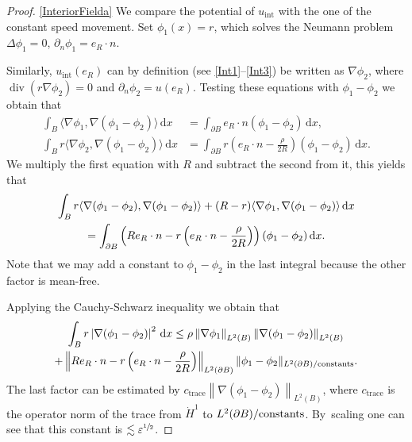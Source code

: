 \documentclass[JEP,XML,SOM,Unicode,published]{cedram}
\let\epsilon\varepsilon
\newcommand{\constants}{\textup{constants}}
\theoremstyle{definition}
\renewcommand{\div}{\operatorname{div}}
\newcommand\norm[1]{\left\lVert #1\right\rVert}
\newcommand\anorm[1]{\lVert #1\rVert}
\newcommand\scalar[2]{\langle #1,#2\rangle}
\newcommand\eq{=}
\newcommand\dd{\,\mathrm{d}}
\newcommand\dx{\dd x}
\let\de\partial
\let\eps\epsilon
\begin{document}
\skpt
\begin{proof}

\eqref{InteriorFielda}
We compare the potential of $u_\mathrm{int}$ with the one of the constant speed movement.
Set $\phi_1(x)=r$, which solves the Neumann problem $\Delta \phi_1=0$, $\de_n\phi_1=e_R\cdot n$.

Similarly, $u_\mathrm{int}(e_R)$ can by definition (see \eqref{Int1}--\eqref{Int3}) be written as $\nabla \phi_2$, where $\div(r\nabla\phi_2)=0$ and $\de_n\phi_2=u(e_R)$. Testing these equations with $\phi_1-\phi_2$ we obtain that
\begin{align*}
\int_{B} \scalar{\nabla \phi_1}{\nabla(\phi_1-\phi_2)}\dx&\eq\int_{\de B} e_R\cdot n(\phi_1-\phi_2)\dx,\\
\int_{B}r\scalar{\nabla \phi_2}{\nabla(\phi_1-\phi_2)}\dx&\eq\int_{\de B}r\left(e_R\cdot n-\frac{\rho}{2R}\right)(\phi_1-\phi_2)\dx.
\end{align*}
We multiply the first equation with $R$ and subtract the second from it, this yields that
\begin{multline*}
\int_{B} r\scalar{\nabla(\phi_1-\phi_2)}{\nabla(\phi_1-\phi_2)}+(R-r)\scalar{\nabla \phi_1}{\nabla(\phi_1-\phi_2)}\dx\\
\eq\int_{\de B} \left(Re_R\cdot n-r\left(e_R\cdot n-\frac{\rho}{2R}\right)\right)(\phi_1-\phi_2)\dx.\notag
\end{multline*}
Note that we may add a constant to $\phi_1-\phi_2$ in the last integral because the other factor is mean-free.

Applying the Cauchy-Schwarz inequality we obtain that
\begin{multline}\label{L2bound1}
\int_{B}r\left|\nabla(\phi_1-\phi_2)\right|^2\dx\leq \rho\norm{\nabla\phi_1}_{L^2(B)}\norm{\nabla(\phi_1-\phi_2)}_{L^2(B)}\\
+\norm{Re_R\cdot n-r\left(e_R\cdot n-\frac{\rho}{2R}\right)}_{L^2(\de B)}\anorm{\phi_1-\phi_2}_{L^2(\de B)/\constants}.
\end{multline}
The last factor can be estimated by $c_\mathrm{trace}\norm{\nabla(\phi_1-\phi_2)}_{L^2(B)}$, where $c_\mathrm{trace}$ is the operator norm of the trace from $\dot{H}^1$ to $L^2(\de B)/\constants$. By~scaling one can see that this constant is $\lesssim \eps^{\sfrac12}$.


\end{proof}
\end{document}

